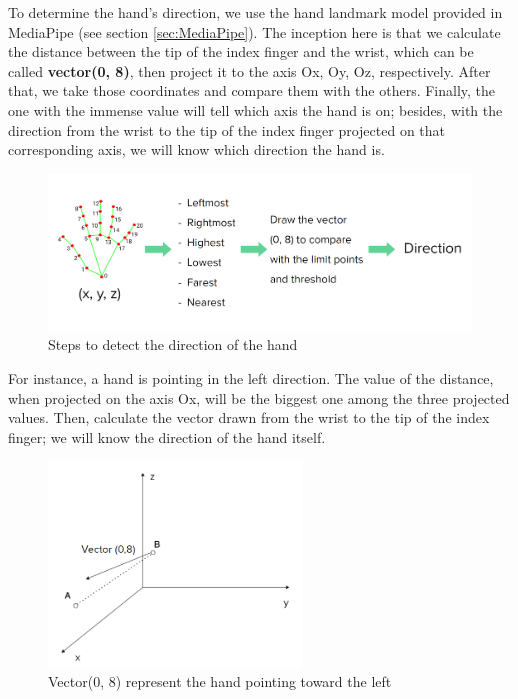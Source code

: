 To determine the hand's direction, we use the hand landmark model provided in MediaPipe (see section \ref{sec:MediaPipe}). The inception here is that we calculate the distance between the tip of the index finger and the wrist, which can be called \textbf{vector(0, 8)}, then project it to the axis Ox, Oy, Oz, respectively. After that, we take those coordinates and compare them with the others. Finally, the one with the immense value will tell which axis the hand is on; besides, with the direction from the wrist to the tip of the index finger projected on that corresponding axis, we will know which direction the hand is.

\begin{figure}[H]
	\centering
	\includegraphics[width=\textwidth]{img/Chap4/DirectionSteps.png}
	\caption{Steps to detect the direction of the hand}
	\label{fig:Chap4-DirectionSteps}
\end{figure}

For instance, a hand is pointing in the left direction. The value of the distance, when projected on the axis Ox, will be the biggest one among the three projected values. Then, calculate the vector drawn from the wrist to the tip of the index finger; we will know the direction of the hand itself.

\begin{figure}[H]
	\centering
	\includegraphics[width=0.6\textwidth]{img/Chap4/vector0-8-forwardLeft.png}
	\caption{Vector(0, 8) represent the hand pointing toward the left}
	\label{fig:Chap4-vector0-8-forwardLeft}
\end{figure}

